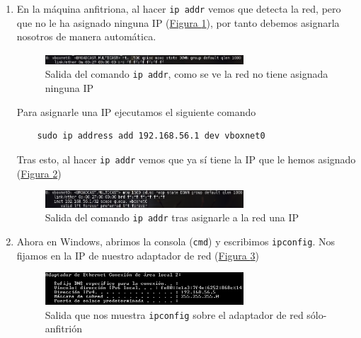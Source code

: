 \documentclass[10pt,a4paper,spanish]{article}
\numberwithin{equation}{section} %
\numberwithin{figure}{section} %
\numberwithin{table}{section} %
\begin{document}
\begin{enumerate}[1.]
    \item En la máquina anfitriona, al hacer \texttt{ip addr} vemos que detecta la red, pero que no le ha asignado ninguna IP (\hyperref[ipaddr]{Figura \ref*{ipaddr}}), por tanto debemos asignarla nosotros de manera automática.
    \begin{figure}[!h]
        \centering
        \includegraphics[width=0.7\textwidth]{25}
        \caption{Salida del comando \texttt{ip addr}, como se ve la red no tiene asignada ninguna IP}
        \label{ipaddr}
    \end{figure}

    Para asignarle una IP ejecutamos el siguiente comando
    \begin{verbatim}
    sudo ip address add 192.168.56.1 dev vboxnet0
    \end{verbatim}

    Tras esto, al hacer \texttt{ip addr} vemos que ya sí tiene la IP que le hemos asignado (\hyperref[ipaddr2]{Figura \ref*{ipaddr2}})
    \begin{figure}[!h]
        \centering
        \includegraphics[width=0.7\textwidth]{26}
        \caption{Salida del comando \texttt{ip addr} tras asignarle a la red una IP}
        \label{ipaddr2}
    \end{figure}

    \item Ahora en Windows, abrimos la consola (\texttt{cmd}) y escribimos \texttt{ipconfig}. Nos fijamos en la IP de nuestro adaptador de red (\hyperref[cmd]{Figura \ref*{cmd}})
    \begin{figure}
        \centering
        \includegraphics[width=0.7\textwidth]{27} 
        \caption{Salida que nos muestra \texttt{ipconfig} sobre el adaptador de red sólo-anfitrión}
        \label{cmd}
    \end{figure}


\end{enumerate}
\end{document}
